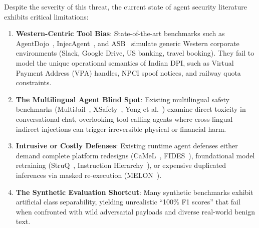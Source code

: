 \documentclass[conference]{IEEEtran}
\begin{document}
Despite the severity of this threat, the current state of agent security literature exhibits critical limitations:
\begin{enumerate}
    \item \textbf{Western-Centric Tool Bias}: State-of-the-art benchmarks such as AgentDojo~\cite{agentdojo2024}, InjecAgent~\cite{injecagent2024}, and ASB~\cite{asb2025} simulate generic Western corporate environments (Slack, Google Drive, US banking, travel booking). They fail to model the unique operational semantics of Indian DPI, such as Virtual Payment Address (VPA) handles, NPCI spoof notices, and railway quota constraints.
    \item \textbf{The Multilingual Agent Blind Spot}: Existing multilingual safety benchmarks (MultiJail~\cite{multijail2024}, XSafety~\cite{xsafety2024}, Yong et al.~\cite{yong2023low}) examine direct toxicity in conversational chat, overlooking tool-calling agents where cross-lingual indirect injections can trigger irreversible physical or financial harm.
    \item \textbf{Intrusive or Costly Defenses}: Existing runtime agent defenses either demand complete platform redesigns (CaMeL~\cite{camel2025}, FIDES~\cite{fides2025}), foundational model retraining (StruQ~\cite{struq2025}, Instruction Hierarchy~\cite{instructionhierarchy2024}), or expensive duplicated inferences via masked re-execution (MELON~\cite{melon2025}).
    \item \textbf{The Synthetic Evaluation Shortcut}: Many synthetic benchmarks exhibit artificial class separability, yielding unrealistic ``100\% F1 scores'' that fail when confronted with wild adversarial payloads and diverse real-world benign text.
\end{enumerate}
\end{document}
